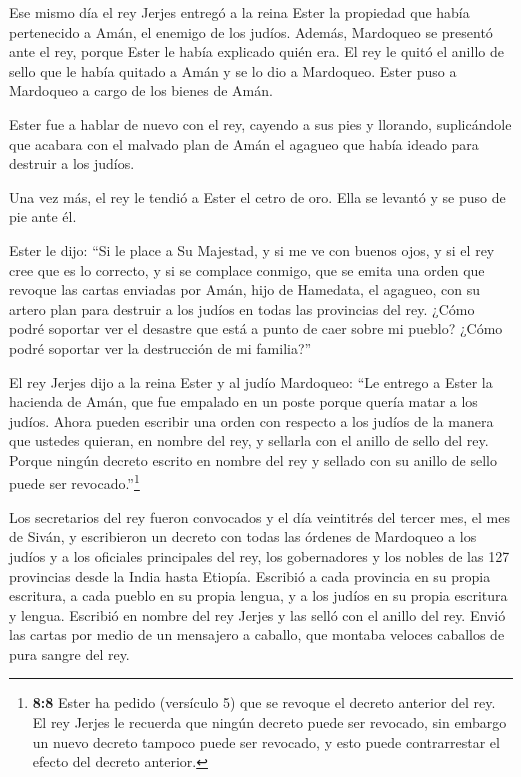  Ese mismo día el rey Jerjes entregó a la reina Ester la
propiedad que había pertenecido a Amán, el enemigo de los judíos.
Además, Mardoqueo se presentó ante el rey, porque Ester le había
explicado quién era.  El rey le quitó el anillo de sello que
le había quitado a Amán y se lo dio a Mardoqueo. Ester puso a Mardoqueo
a cargo de los bienes de Amán.

 Ester fue a hablar de nuevo con el rey, cayendo a sus pies
y llorando, suplicándole que acabara con el malvado plan de Amán el
agagueo que había ideado para destruir a los judíos.

 Una vez más, el rey le tendió a Ester el cetro de oro. Ella
se levantó y se puso de pie ante él.

 Ester le dijo: ``Si le place a Su Majestad, y si me ve con
buenos ojos, y si el rey cree que es lo correcto, y si se complace
conmigo, que se emita una orden que revoque las cartas enviadas por
Amán, hijo de Hamedata, el agagueo, con su artero plan para destruir a
los judíos en todas las provincias del rey.  ¿Cómo podré
soportar ver el desastre que está a punto de caer sobre mi pueblo? ¿Cómo
podré soportar ver la destrucción de mi familia?''

 El rey Jerjes dijo a la reina Ester y al judío Mardoqueo:
``Le entrego a Ester la hacienda de Amán, que fue empalado en un poste
porque quería matar a los judíos.  Ahora pueden escribir una
orden con respecto a los judíos de la manera que ustedes quieran, en
nombre del rey, y sellarla con el anillo de sello del rey. Porque ningún
decreto escrito en nombre del rey y sellado con su anillo de sello puede
ser revocado.''\footnote{\textbf{8:8} Ester ha pedido (versículo 5) que
  se revoque el decreto anterior del rey. El rey Jerjes le recuerda que
  ningún decreto puede ser revocado, sin embargo un nuevo decreto
  tampoco puede ser revocado, y esto puede contrarrestar el efecto del
  decreto anterior.}

 Los secretarios del rey fueron convocados y el día
veintitrés del tercer mes, el mes de Siván, y escribieron un decreto con
todas las órdenes de Mardoqueo a los judíos y a los oficiales
principales del rey, los gobernadores y los nobles de las 127 provincias
desde la India hasta Etiopía. Escribió a cada provincia en su propia
escritura, a cada pueblo en su propia lengua, y a los judíos en su
propia escritura y lengua.  Escribió en nombre del rey
Jerjes y las selló con el anillo del rey. Envió las cartas por medio de
un mensajero a caballo, que montaba veloces caballos de pura sangre del
rey.

